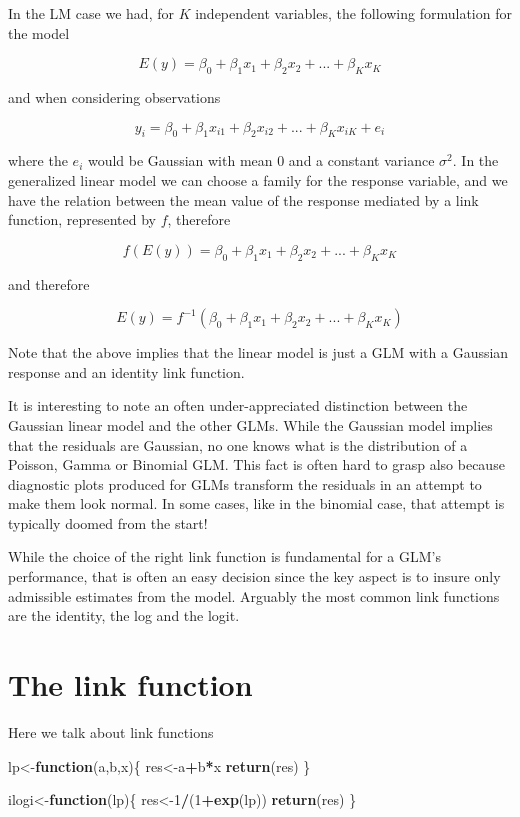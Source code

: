 \documentclass[
]{book}
\newenvironment{Shaded}{\begin{snugshade}}{\end{snugshade}}
\newcommand{\ControlFlowTok}[1]{\textcolor[rgb]{0.13,0.29,0.53}{\textbf{#1}}}
\newcommand{\DecValTok}[1]{\textcolor[rgb]{0.00,0.00,0.81}{#1}}
\newcommand{\FunctionTok}[1]{\textcolor[rgb]{0.13,0.29,0.53}{\textbf{#1}}}
\newcommand{\NormalTok}[1]{#1}
\newcommand{\OtherTok}[1]{\textcolor[rgb]{0.56,0.35,0.01}{#1}}
\newcommand{\SpecialCharTok}[1]{\textcolor[rgb]{0.81,0.36,0.00}{\textbf{#1}}}
\begin{document}
In the LM case we had, for \(K\) independent variables, the following formulation for the model

\[E(y)=\beta_0+\beta_1x_1+\beta_2x_2+...+\beta_Kx_K\]

and when considering observations

\[y_i=\beta_0+\beta_1x_{i1}+\beta_2x_{i2}+...+\beta_Kx_{iK}+e_i\]

where the \(e_i\) would be Gaussian with mean 0 and a constant variance \(\sigma^2\). In the generalized linear model we can choose a family for the response variable, and we have the relation between the mean value of the response mediated by a link function, represented by \(f\), therefore

\[f(E(y))=\beta_0+\beta_1x_1+\beta_2x_2+...+\beta_Kx_K\]

and therefore

\[E(y)=f^{-1}(\beta_0+\beta_1x_1+\beta_2x_2+...+\beta_Kx_K)\]

Note that the above implies that the linear model is just a GLM with a Gaussian response and an identity link function.

It is interesting to note an often under-appreciated distinction between the Gaussian linear model and the other GLMs. While the Gaussian model implies that the residuals are Gaussian, no one knows what is the distribution of a Poisson, Gamma or Binomial GLM. This fact is often hard to grasp also because diagnostic plots produced for GLMs transform the residuals in an attempt to make them look normal. In some cases, like in the binomial case, that attempt is typically doomed from the start!

While the choice of the right link function is fundamental for a GLM's performance, that is often an easy decision since the key aspect is to insure only admissible estimates from the model. Arguably the most common link functions are the identity, the log and the logit.

\hypertarget{the-link-function}{%
\section{The link function}\label{the-link-function}}

Here we talk about link functions

\begin{Shaded}
\begin{Highlighting}[]
\NormalTok{lp}\OtherTok{\textless{}{-}}\ControlFlowTok{function}\NormalTok{(a,b,x)\{}
\NormalTok{  res}\OtherTok{\textless{}{-}}\NormalTok{a}\SpecialCharTok{+}\NormalTok{b}\SpecialCharTok{*}\NormalTok{x}
  \FunctionTok{return}\NormalTok{(res)}
\NormalTok{\}}

\NormalTok{ilogi}\OtherTok{\textless{}{-}}\ControlFlowTok{function}\NormalTok{(lp)\{}
\NormalTok{  res}\OtherTok{\textless{}{-}}\DecValTok{1}\SpecialCharTok{/}\NormalTok{(}\DecValTok{1}\SpecialCharTok{+}\FunctionTok{exp}\NormalTok{(lp))}
  \FunctionTok{return}\NormalTok{(res)}
\NormalTok{\}}
\end{Highlighting}
\end{Shaded}
\end{document}
